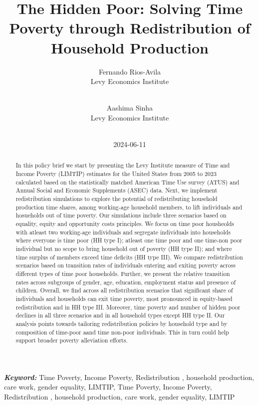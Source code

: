 \documentclass[
  11pt,
]{article}
\title{The Hidden Poor: Solving Time Poverty through Redistribution of
Household Production}
\author{
Fernando Rios-Avila\\
Levy Economics Institute\\
\\
\and 
Aashima Sinha\\
Levy Economics Institute\\
\\
}
\date{2024-06-11}
\begin{document}
\def\spacingset#1{\renewcommand{\baselinestretch}%
{#1}\small\normalsize} \spacingset{1}


\maketitle
\begin{abstract}
In this policy brief we start by presenting the Levy Institute measure
of Time and Income Poverty (LIMTIP) estimates for the United States from
2005 to 2023 calculated based on the statistically matched American Time
Use survey (ATUS) and Annual Social and Economic Supplements (ASEC)
data. Next, we implement redistribution simulations to explore the
potential of redistributing household production time shares, among
working-age household members, to lift individuals and hosueholds out of
time poverty. Our simulations include three scenarios based on equality,
equity and opportunity costs principles. We focus on time poor
housheolds with atleast two working-age individuals and segregate
individuals into households where everyone is time poor (HH type I);
atleast one time poor and one time-non poor individual but no scope to
bring household out of poverty (HH type II); and where time surplus of
members exceed time deficits (HH type III). We compare redistribution
scenarios based on transition rates of individuals entering and exiting
poverty across different types of time poor households. Further, we
present the relative transition rates across subgroups of gender, age,
education, employment status and presence of children. Overall, we find
across all redistribution scenarios that significant share of
individuals and households can exit time poverty, most pronounced in
equity-based redistribution and in HH type III. Moreover, time poverty
and number of hidden poor declines in all three scenarios and in all
household types except HH type II. Our analysis points towards tailoring
redistribution policies by household type and by composition of
time-poor aand time non-poor individuals. This in turn could help
support broader poverty alleviation efforts.
\end{abstract}
 
\vspace{.2in}

\textbf{\textit{Keyword: }}
    Time Poverty, Income Poverty, Redistribution , household production,
care work, gender equality, LIMTIP, 
    Time Poverty, Income Poverty, Redistribution , household production,
care work, gender equality, LIMTIP 
\end{document}
